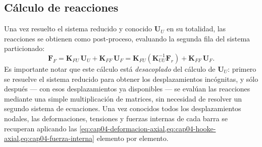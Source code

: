 \subsection{Cálculo de reacciones}

Una vez resuelto el sistema reducido y conocido $\mathbf{U}_U$ en su totalidad, las reacciones se obtienen como post-proceso, evaluando la segunda fila del sistema particionado:
\begin{equation}
\mathbf{F}_F = \mathbf{K}_{FU}\,\mathbf{U}_U + \mathbf{K}_{FF}\,\mathbf{U}_F = \mathbf{K}_{FU}\left(\mathbf{K}_{UU}^{-1}\mathbf{F}_r\right) + \mathbf{K}_{FF}\,\mathbf{U}_F .
\label{eq:cap04-reacciones}
\end{equation}
Es importante notar que este cálculo está \emph{desacoplado} del cálculo de $\mathbf{U}_U$: primero se resuelve el sistema reducido para obtener los desplazamientos incógnitas, y sólo después --- con esos desplazamientos ya disponibles --- se evalúan las reacciones mediante una simple multiplicación de matrices, sin necesidad de resolver un segundo sistema de ecuaciones. Una vez conocidos todos los desplazamientos nodales, las deformaciones, tensiones y fuerzas internas de cada barra se recuperan aplicando las \cref{eq:cap04-deformacion-axial,eq:cap04-hooke-axial,eq:cap04-fuerza-interna} elemento por elemento.

